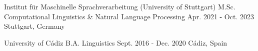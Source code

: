

\begin{cventries}

  \cventry 
    {Institut für Maschinelle Sprachverarbeitung (University of Stuttgart)} %
    {M.Sc. Computational Linguistics \& Natural Language Processing} %
    {Apr. 2021 - Oct. 2023} %
    {Stuttgart, Germany} %
    {
    }

  \cventry
    {University of Cádiz} %
    {B.A. Linguistics} %
    {Sept. 2016 - Dec. 2020} %
    {Cádiz, Spain} %
    {
    }

\end{cventries}
